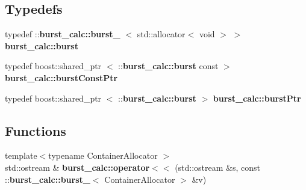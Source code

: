\subsection*{\-Typedefs}
\begin{DoxyCompactItemize}
\item 
typedef \-::{\bf burst\-\_\-calc\-::burst\-\_\-}\*
$<$ std\-::allocator$<$ void $>$ $>$ {\bf burst\-\_\-calc\-::burst}
\item 
typedef boost\-::shared\-\_\-ptr\*
$<$ \-::{\bf burst\-\_\-calc\-::burst} const  $>$ {\bf burst\-\_\-calc\-::burst\-Const\-Ptr}
\item 
typedef boost\-::shared\-\_\-ptr\*
$<$ \-::{\bf burst\-\_\-calc\-::burst} $>$ {\bf burst\-\_\-calc\-::burst\-Ptr}
\end{DoxyCompactItemize}
\subsection*{\-Functions}
\begin{DoxyCompactItemize}
\item 
{\footnotesize template$<$typename Container\-Allocator $>$ }\\std\-::ostream \& {\bf burst\-\_\-calc\-::operator$<$$<$} (std\-::ostream \&s, const \-::{\bf burst\-\_\-calc\-::burst\-\_\-}$<$ \-Container\-Allocator $>$ \&v)
\end{DoxyCompactItemize}
